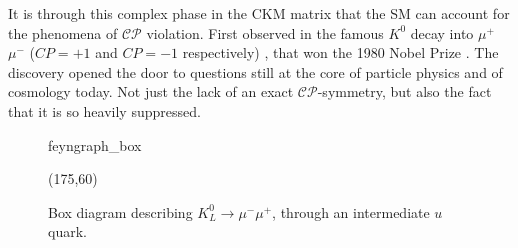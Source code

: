 \documentclass[10pt]{report}
\newcommand{\mylbrace}[2]{\vspace{#2pt}\hspace{6pt}\scaleleftright[\dimexpr5pt+#1\dimexpr0.06pt]{\lbrace}{\rule[\dimexpr2pt-#1\dimexpr0.5pt]{-4pt}{#1pt}}{.}}
\begin{document}
It is through this complex phase in the CKM matrix that the SM can account for the phenomena of $\mathcal{CP}$ violation. First observed in the famous $K^0$ decay into $\mu^+$ $\mu^-$ ($CP=+1$ and $CP=-1$ respectively) \cite{PhysRevLett.13.138}, that won the 1980 Nobel Prize \cite{NobelPrize:1980-Physics}. The discovery opened the door to questions still at the core of particle physics and of cosmology today. Not just the lack of an exact $\mathcal{CP}$-symmetry, but also the fact that it is so heavily suppressed.
%
\begin{figure}[H]
	\centering
	\vspace{1em}
	\begin{fmffile}{feyngraph_box}
		\begin{fmfgraph*}(175,60)
			\fmfstraight
			\fmfv{l.d=65,l.a=180,l={$\text{K}^0$\mylbrace{76}{0}}}{K}
		\end{fmfgraph*}
	\end{fmffile}
	\vspace{1em}
	\caption{Box diagram describing $K_L^0\rightarrow\mu^-\mu^+$, through an intermediate $u$ quark. }
	\label{fig:Kaon}
\end{figure}
\end{document}
